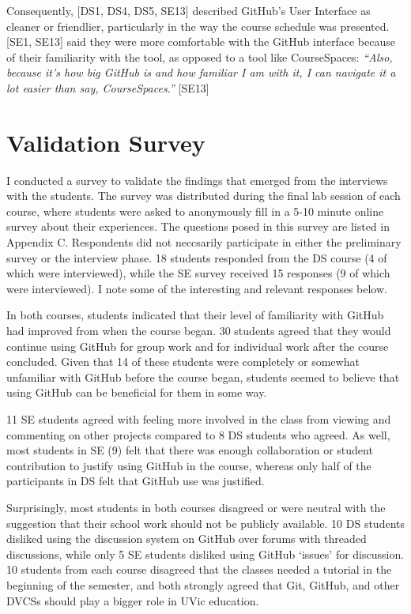 Consequently, [DS1, DS4, DS5, SE13] described GitHub's User Interface as cleaner or friendlier, particularly in the way the course schedule was presented. [SE1, SE13] said they were more comfortable with the GitHub interface because of their familiarity with the tool, as opposed to a tool like CourseSpaces: \textit{``Also, because it's how big GitHub is and how familiar I am with it, I can navigate it a lot easier than say, CourseSpaces.''} [SE13]


\section{Validation Survey}
I conducted a survey to validate the findings that emerged from the interviews with the students. The survey was distributed during the final lab session of each course, where students were asked to anonymously fill in a 5-10 minute online survey about their experiences. The questions posed in this survey are listed in Appendix C. Respondents did not neccsarily participate in either the preliminary survey or the interview phase. 18 students responded from the DS course (4 of which were interviewed), while the SE survey received 15 responses (9 of which were interviewed). I note some of the interesting and relevant responses below.

In both courses, students indicated that their level of familiarity with GitHub had improved from when the course began. 30 students agreed that they would continue using GitHub for group work and for individual work after the course concluded. Given that 14 of these students were completely or somewhat unfamiliar with GitHub before the course began, students seemed to believe that using GitHub can be beneficial for them in some way.

11 SE students agreed with feeling more involved in the class from viewing and commenting on other projects compared to 8 DS students who agreed. As well, most students in SE (9) felt that there was enough collaboration or student contribution to justify using GitHub in the course, whereas only half of the participants in DS felt that GitHub use was justified.

Surprisingly, most students in both courses disagreed or were neutral with the suggestion that their school work should not be publicly available. 10 DS students disliked using the discussion system on GitHub over forums with threaded discussions, while only 5 SE students disliked using GitHub `issues' for discussion. 10 students from each course disagreed that the classes needed a tutorial in the beginning of the semester, and both strongly agreed that Git, GitHub, and other DVCSs should play a bigger role in UVic education.

